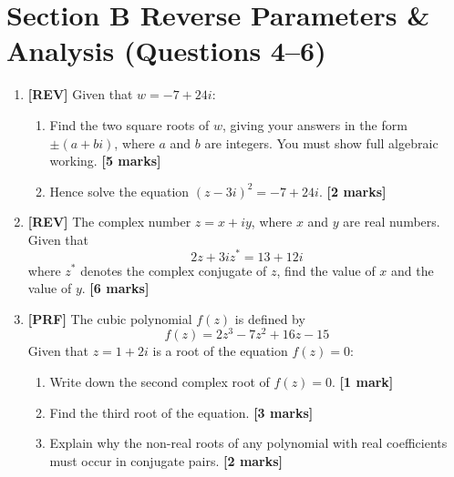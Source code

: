 \documentclass[11pt,a4paper]{article}
\begin{document}
\section*{Section B \quad Reverse Parameters \& Analysis \hfill{\normalfont\small(Questions 4--6)}}
\begin{enumerate}[resume]

\item \textbf{[REV]} Given that $w = -7 + 24i$:
\begin{enumerate}[label=(\alph*)]
  \item Find the two square roots of $w$, giving your answers in the form $\pm(a + bi)$, where $a$ and $b$ are integers. You must show full algebraic working. \hfill{\textbf{[5 marks]}}
  \item Hence solve the equation $(z - 3i)^2 = -7 + 24i$. \hfill{\textbf{[2 marks]}}
\end{enumerate}

\item \textbf{[REV]} The complex number $z = x + iy$, where $x$ and $y$ are real numbers.
Given that
\[
2z + 3iz^* = 13 + 12i
\]
where $z^*$ denotes the complex conjugate of $z$, find the value of $x$ and the value of $y$. \hfill{\textbf{[6 marks]}}

\item \textbf{[PRF]} The cubic polynomial $f(z)$ is defined by
\[
f(z) = 2z^3 - 7z^2 + 16z - 15
\]
Given that $z = 1 + 2i$ is a root of the equation $f(z) = 0$:
\begin{enumerate}[label=(\alph*)]
  \item Write down the second complex root of $f(z) = 0$. \hfill{\textbf{[1 mark]}}
  \item Find the third root of the equation. \hfill{\textbf{[3 marks]}}
  \item Explain why the non-real roots of any polynomial with real coefficients must occur in conjugate pairs. \hfill{\textbf{[2 marks]}}
\end{enumerate}

\end{enumerate}
\end{document}
